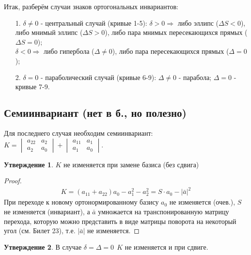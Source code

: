 \documentclass[a4paper, 12pt]{article}
\theoremstyle{definition}
\newtheorem*{subtheorem}{Утверждение}
\begin{document}
	Итак, разберём случаи знаков ортогональных инвариантов:
	\begin{enumerate}
		\item [\LARGE 1.] $\delta \neq 0$ - центральный случай (кривые 1-5):
		$\delta > 0 \Rightarrow$ либо эллипс ($\Delta S < 0$), либо мнимый эллипс ($\Delta S > 0$), либо пара мнимых пересекающихся прямых ($\Delta S = 0$);\\
		$\delta < 0 \Rightarrow$ либо гипербола ($\Delta \neq 0$), либо пара пересекающихся прямых ($\Delta = 0$); 
		\item [\LARGE 2.] $\delta = 0$ - параболический случай (кривые 6-9):
		$\Delta \neq 0$ - парабола;
		$\Delta = 0$ - кривые 7-9.
	\end{enumerate} 
	\subsection{Семиинвариант (нет в б., но полезно)}
	Для последнего случая необходим семиинвариант: $K = \begin{vmatrix} a_{22}&a_2 \\ a_2&a_0 \end{vmatrix} + \begin{vmatrix} a_{11}&a_1 \\ a_1&a_0 \end{vmatrix}$.
	\begin{subtheorem}
		$K$ не изменяется при замене базиса (без сдвига)
	\end{subtheorem}
	\begin{proof}
		\begin{align*}
			K = (a_{11} + a_{22})a_0 - a_1^2 - a_2^2 = S\cdot a_0 - |\bar{a}|^2
		\end{align*}
		При переходе к новому ортонормированному базису $a_0$ не изменяется (очев.), $S$ не изменяется (инвариант), а $\bar{a}$ умножается на транспонированную матрицу перехода, которую можно представить в виде матрицы поворота на некоторый угол (см. Билет 23), т.е. $|\bar{a}|$ не изменяется. 
	\end{proof}
	\begin{subtheorem}
		В случае $\delta = \Delta = 0 \ \ K$ не изменяется и при сдвиге.
	\end{subtheorem}
\end{document}
